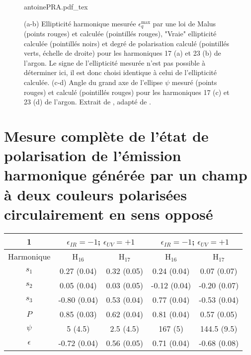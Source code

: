 \begin{figure}
\centering
\def\svgwidth{\textwidth}
{antoinePRA.pdf_tex}
\caption{(a-b) Ellipticité harmonique mesurée $\epsilon_q^{\text{max}}$ par une loi de Malus (points rouges) et calculée (pointillés rouges), "Vraie" ellipticité calculée (pointillés noirs) et degré de polarisation calculé (pointillés verts, échelle de droite) pour les harmoniques 17 (a) et 23 (b) de l'argon. Le signe de l'ellipticité mesurée n'est pas possible à déterminer ici, il est donc choisi identique à celui de l'ellipticité calculée. (c-d) Angle du grand axe de l'ellipse $\psi$ mesuré (points rouges) et calculé (pointillés rouges) pour les harmoniques 17 (c) et 23 (d) de l'argon. Extrait de , adapté de .}
\label{fig:Antoine}
\end{figure}













\chapter{Mesure complète de l'état de polarisation de l'émission harmonique générée par un champ à deux couleurs polarisées circulairement en sens opposé} 
\label{chap:MesurePolar}

\begin{tabular}{|c|c|c|c|c|}
\hline
1 & \multicolumn{2}{c|}{$\epsilon_{IR} = -1$; $\epsilon_{UV} = +1$} &  \multicolumn{2}{c|}{$\epsilon_{IR} = -1$; $\epsilon_{UV} = +1$} \\
\hline
Harmonique & H$_{16}$ & H$_{17}$ & H$_{16}$ & H$_{17}$ \\
\hline
$s_1$ & 0.27 (0.04) & 0.32 (0.05) & 0.24 (0.04) & 0.07 (0.07) \\
\hline
$s_2$ & 0.05 (0.04) & 0.03 (0.05) & -0.12 (0.04) & -0.20 (0.07) \\
\hline
$s_3$ & -0.80 (0.04) & 0.53 (0.04) & 0.77 (0.04) & -0.53 (0.04) \\
\hline
$P$ & 0.85 (0.03) & 0.62 (0.04) & 0.81 (0.04) & 0.57 (0.05) \\
\hline
$\psi$ & 5 (4.5) & 2.5 (4.5) & 167 (5) & 144.5 (9.5) \\
\hline
$\epsilon$ & -0.72 (0.04) & 0.56 (0.05) & 0.71 (0.04) & -0.68 (0.08) \\
\hline
\end{tabular}
